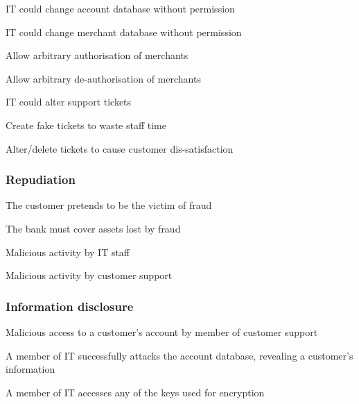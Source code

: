 \begin{numbered}[resume]

    \item \label{tamperAccountDatabase} IT could change account database without permission

    \item \label{tamperMerchantDatabase} IT could change merchant database without permission
    \begin{numbered}
        \item Allow arbitrary authorisation of merchants
        \item Allow arbitrary de-authorisation of merchants
    \end{numbered}

    \item \label{tamperSupportTickets} IT could alter support tickets
    \begin{numbered}
        \item Create fake tickets to waste staff time
        \item Alter/delete tickets to cause customer dis-satisfaction
    \end{numbered}
\end{numbered}

\subsubsection{Repudiation}

\begin{numbered}[resume]
    \item \label{repudiationFraud} The customer pretends to be the victim of fraud
    \begin{numbered}
        \item The bank must cover assets lost by fraud
    \end{numbered}

    \item \label{repudiationIt} Malicious activity by IT staff
    \item \label{repudiationCustomerSupport} Malicious activity by customer support
\end{numbered}

\subsubsection{Information disclosure}

\begin{numbered}[resume]
    \item \label{disclosureCustomerSupport} Malicious access to a customer's account by member of customer support
    
    \item \label{disclosureItDetails} A member of IT successfully attacks the account database, revealing a customer's information

    \item \label{disclosureItKeys} A member of IT accesses any of the keys used for encryption
\end{numbered}

